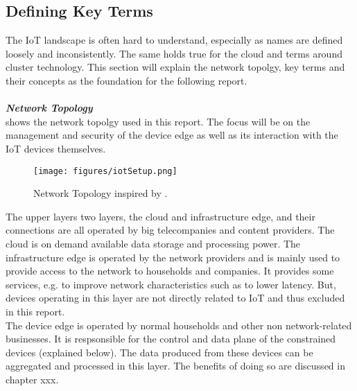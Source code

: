 \subsection{Defining Key Terms}
The IoT landscape is often hard to understand, especially as names are defined loosely and  inconsistently. The same holds true for the cloud and terms around cluster technology. This section will explain the network topolgy, key terms and their concepts as the foundation for the following report.\\
\vspace{0.5mm} \ \\
\textbf{\textit{Network Topology}}\\
 shows the network topolgy used in this report. The focus will be on the management and security of the device edge as well as its interaction with the IoT devices themselves. 
\begin{figure}[h!]
    \centering
    \texttt{[image: figures/iotSetup.png]}
    \caption{Network Topology inspired by \cite{iotGatewaySlavesGraph}.}
    \label{fig:netowrkTopology}
\end{figure}
The upper layers two layers, the cloud and infrastructure edge, and their connections are all operated by big telecompanies and content providers. The cloud is on demand available data storage and processing power. The infrastructure edge is operated by the network providers and is mainly used to provide access to the network to households and companies. It provides some services, e.g. to improve network characteristics such as to lower latency. But, devices operating in this layer are not directly related to IoT and thus excluded in this report.\\
The device edge is operated by normal households and other non network-related businesses. It is respsonsible for the control and data plane of the constrained devices (explained below). The data produced from these devices can be aggregated and processed in this layer. The benefits of doing so are discussed in chapter xxx.

